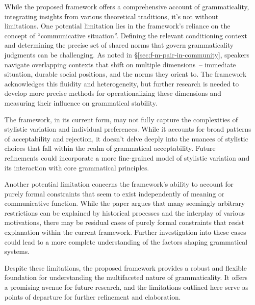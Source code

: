 \documentclass[12pt,letterpaper]{article}
\begin{document}
While the proposed framework offers a comprehensive account of grammaticality, integrating insights from various theoretical traditions, it's not without limitations. One potential limitation lies in the framework's reliance on the concept of \enquote{communicative situation}. Defining the relevant conditioning context and determining the precise set of shared norms that govern grammaticality judgments can be challenging. As noted in \S\ref{sec:f-m-pair-in-community}, speakers navigate overlapping contexts that shift on multiple dimensions~-- immediate situation, durable social positions, and the norms they orient to. The framework acknowledges this fluidity and heterogeneity, but further research is needed to develop more precise methods for operationalizing these dimensions and measuring their influence on grammatical stability.

The framework, in its current form, may not fully capture the complexities of stylistic variation and individual preferences. While it accounts for broad patterns of acceptability and rejection, it doesn't delve deeply into the nuances of stylistic choices that fall within the realm of grammatical acceptability. Future refinements could incorporate a more fine-grained model of stylistic variation and its interaction with core grammatical principles.

Another potential limitation concerns the framework's ability to account for purely formal constraints that seem to exist independently of meaning or communicative function. While the paper argues that many seemingly arbitrary restrictions can be explained by historical processes and the interplay of various motivations, there may be residual cases of purely formal constraints that resist explanation within the current framework. Further investigation into these cases could lead to a more complete understanding of the factors shaping grammatical systems.


Despite these limitations, the proposed framework provides a robust and flexible foundation for understanding the multifaceted nature of grammaticality. It offers a promising avenue for future research, and the limitations outlined here serve as points of departure for further refinement and elaboration.
\end{document}
